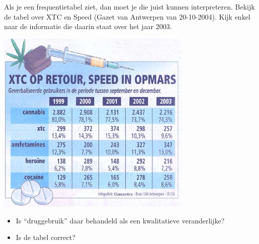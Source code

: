 \documentclass[12pt,twoside]{article}
\begin{document}
\begin{oefening}

Als je een frequentietabel ziet, dan moet je die juist kunnen interpreteren. Bekijk de tabel over XTC en Speed (Gazet van Antwerpen van 20-10-2004). Kijk enkel naar de informatie die daarin staat over het jaar 2003.

\begin{center}
\includegraphics[width=0.7\textwidth]{tabel-drugs}
\end{center}

\begin{itemize}
  \item Is “druggebruik” daar behandeld als een kwalitatieve veranderlijke?
  \item Is de tabel correct?
\end{itemize}
\end{oefening}
\end{document}
